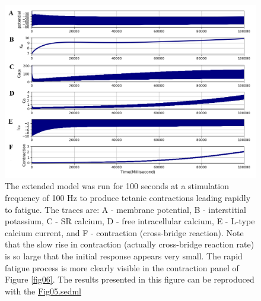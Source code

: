 \documentclass[fleqn,10pt]{physiome}
\begin{document}
\begin{figure}[h!]
\centering
\includegraphics[width=0.9\linewidth]{figure05}
\caption{The extended model was run for 100 seconds at a stimulation frequency of 100 Hz to produce tetanic contractions leading rapidly to fatigue. The traces are: A - membrane potential, B - interstitial potassium, C - SR calcium, D - free intracellular calcium, E - L-type calcium current, and F - contraction (cross-bridge reaction). Note that the slow rise in contraction (actually cross-bridge reaction rate) is so large that the initial response appears very small. The rapid fatigue process is more clearly visible in the contraction panel of Figure \ref{fig06}. The results presented in this figure can be reproduced with the \href{https://models.physiomeproject.org/workspace/5f4/file/26289d9227fbf4f66ca8106d8bf80ff9a51a5ac6/Fig05.sedml}{Fig05.sedml}}
\label{fig05}
\end{figure}
\end{document}
